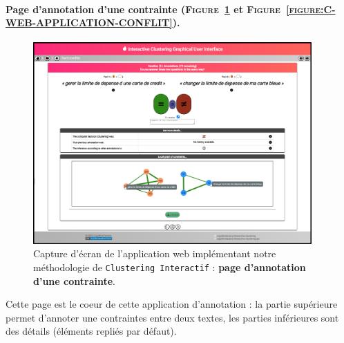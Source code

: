 	
		\paragraph{Page d'annotation d'une contrainte (\textsc{Figure~\ref{figure:C-WEB-APPLICATION-ANNOTATION}} et \textsc{Figure~\ref{figure:C-WEB-APPLICATION-CONFLIT}}).}
		
			\begin{figure}[H]
				\centering
				\includegraphics[width=0.95\textwidth]{figures/interactive-clustering-application-annotation-0full}
				\caption{
					Capture d'écran de l'application web implémentant notre méthodologie de \texttt{Clustering Interactif} : \textbf{page d'annotation d'une contrainte}.
				}
				\label{figure:C-WEB-APPLICATION-ANNOTATION}
			\end{figure}
			
			Cette page est le coeur de cette application d'annotation : la partie supérieure permet d'annoter une contraintes entre deux textes, les parties inférieures sont des détails (éléments repliés par défaut).
			
